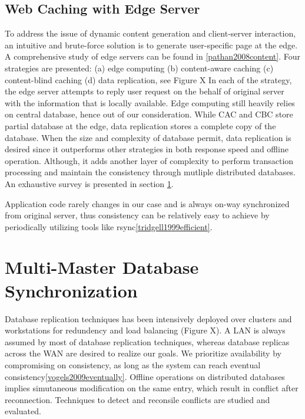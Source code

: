 
\subsection{Web Caching with Edge Server}
To address the issue of dynamic content generation and client-server interaction, an intuitive and brute-force solution is to generate user-specific page at the edge. A comprehensive study of edge servers can be found in \ref{pathan2008content}. Four strategies are presented: (a) edge computing (b) content-aware caching (c) content-blind caching (d) data replication, see Figure X
In each of the strategy, the edge server attempts to reply user request on the behalf of original server with the information that is locally available. Edge computing still heavily relies on central database, hence out of our consideration. While CAC and CBC store partial database at the edge, data replication stores a complete copy of the database. When the size and complexity of database permit, data replication is desired since it outperforms other strategies in both response speed and offline operation. Although, it adds another layer of complexity to perform transaction processing and maintain the consistency through mutliple distributed databases. An exhaustive survey is presented in section \ref{database_sync}.

Application code rarely changes in our case and is always on-way synchronized from original server, thus consistency can be relatively easy to achieve by periodically utilizing tools like rsync\ref{tridgell1999efficient}.


\section{Multi-Master Database Synchronization} \label{database_sync}
Database replication techniques has been intensively deployed over clusters and workstations for redundency and load balancing (Figure X).  A LAN is always assumed by most of database replication techniques, whereas database replicas across the WAN are desired to realize our goals. We prioritize availability by compromising on consistency, as long as the system can reach eventual consistency\ref{vogels2009eventually}. Offline operations on distributed databases implies simutaneous modification on the same entry, which result in conflict after reconnection. Techniques to detect and reconsile conflicts are studied and evaluated.

